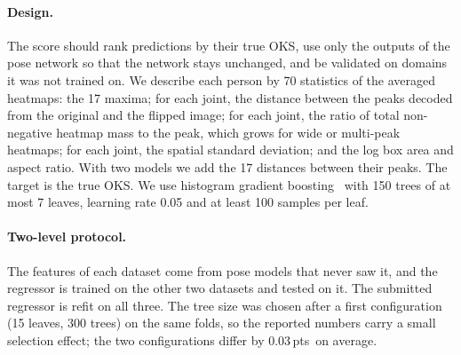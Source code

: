 \documentclass[10pt,twocolumn,letterpaper]{article}
\newcommand{\pts}{\,pts}
\begin{document}
\paragraph{Design.} The score should rank predictions by their true OKS, use only the outputs of the pose network so that the network stays unchanged, and be validated on domains it was not trained on. We describe each person by 70 statistics of the averaged heatmaps: the 17 maxima; for each joint, the distance between the peaks decoded from the original and the flipped image; for each joint, the ratio of total non-negative heatmap mass to the peak, which grows for wide or multi-peak heatmaps; for each joint, the spatial standard deviation; and the log box area and aspect ratio. With two models we add the 17 distances between their peaks. The target is the true OKS. We use histogram gradient boosting~\cite{friedman,lightgbm} with 150 trees of at most 7 leaves, learning rate 0.05 and at least 100 samples per leaf.

\paragraph{Two-level protocol.} The features of each dataset come from pose models that never saw it, and the regressor is trained on the other two datasets and tested on it. The submitted regressor is refit on all three. The tree size was chosen after a first configuration (15 leaves, 300 trees) on the same folds, so the reported numbers carry a small selection effect; the two configurations differ by 0.03\pts\ on average.
\end{document}
